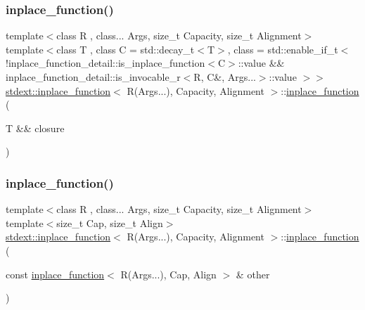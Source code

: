 \subsubsection{\texorpdfstring{inplace\+\_\+function()}{inplace\_function()}\hspace{0.1cm}{\footnotesize\ttfamily [9/14]}}
{\footnotesize\ttfamily template$<$class R , class... Args, size\+\_\+t Capacity, size\+\_\+t Alignment$>$ \\
template$<$class T , class C  = std\+::decay\+\_\+t$<$\+T$>$, class  = std\+::enable\+\_\+if\+\_\+t$<$            !inplace\+\_\+function\+\_\+detail\+::is\+\_\+inplace\+\_\+function$<$\+C$>$\+::value            \&\& inplace\+\_\+function\+\_\+detail\+::is\+\_\+invocable\+\_\+r$<$\+R, C\&, Args...$>$\+::value        $>$$>$ \\
\hyperlink{classstdext_1_1inplace__function}{stdext\+::inplace\+\_\+function}$<$ R(Args...), Capacity, Alignment $>$\+::\hyperlink{classstdext_1_1inplace__function}{inplace\+\_\+function} (\begin{DoxyParamCaption}\item[{T \&\&}]{closure }\end{DoxyParamCaption})\hspace{0.3cm}{\ttfamily [inline]}}

\mbox{\label{classstdext_1_1inplace__function_3_01R_07Args_8_8_8_08_00_01Capacity_00_01Alignment_01_4_adc64caf861ce3703357c901c4691ace7}} 
\subsubsection{\texorpdfstring{inplace\+\_\+function()}{inplace\_function()}\hspace{0.1cm}{\footnotesize\ttfamily [10/14]}}
{\footnotesize\ttfamily template$<$class R , class... Args, size\+\_\+t Capacity, size\+\_\+t Alignment$>$ \\
template$<$size\+\_\+t Cap, size\+\_\+t Align$>$ \\
\hyperlink{classstdext_1_1inplace__function}{stdext\+::inplace\+\_\+function}$<$ R(Args...), Capacity, Alignment $>$\+::\hyperlink{classstdext_1_1inplace__function}{inplace\+\_\+function} (\begin{DoxyParamCaption}\item[{const \hyperlink{classstdext_1_1inplace__function}{inplace\+\_\+function}$<$ R(Args...), Cap, Align $>$ \&}]{other }\end{DoxyParamCaption})\hspace{0.3cm}{\ttfamily [inline]}}

